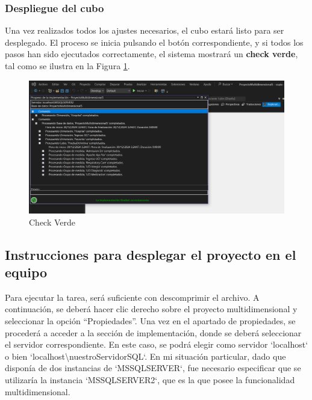 \documentclass[12pt, a4paper, twoside]{article}
\begin{document}
\subsubsection{Despliegue del cubo}

Una vez realizados todos los ajustes necesarios, el cubo estará listo para ser desplegado. El proceso se inicia pulsando el botón correspondiente, y si todos los pasos han sido ejecutados correctamente, el sistema mostrará un \textbf{check verde}, tal como se ilustra en la Figura \ref{fig:31}.

\begin{figure}[H]
	\centering
	\includegraphics[width=1\textwidth]{image/checkVerde}
	\caption{Check Verde}
	\label{fig:31}
\end{figure}


\subsection{Instrucciones para desplegar el proyecto en el equipo}
	 
	 Para ejecutar la tarea, será suficiente con descomprimir el archivo. A continuación, se deberá hacer clic derecho sobre el proyecto multidimensional y seleccionar la opción ``Propiedades''. Una vez en el apartado de propiedades, se procederá a acceder a la sección de implementación, donde se deberá seleccionar el servidor correspondiente. En este caso, se podrá elegir como servidor `localhost` o bien `localhost\textbackslash nuestroServidorSQL`. En mi situación particular, dado que disponía de dos instancias de `MSSQLSERVER`, fue necesario especificar que se utilizaría la instancia `MSSQLSERVER2`, que es la que posee la funcionalidad multidimensional.
	 
\end{document}
